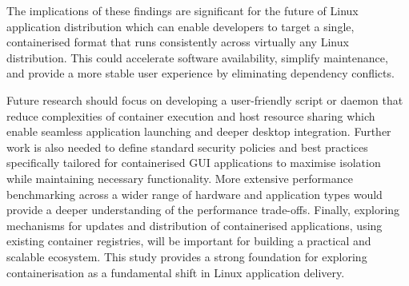 \documentclass[journal,onecolumn]{IEEEtran}
\begin{document}
The implications of these findings are significant for the future of Linux application distribution which can enable developers to target a single, containerised format that runs consistently across virtually any Linux distribution. This could accelerate software availability, simplify maintenance, and provide a more stable user experience by eliminating dependency conflicts.

Future research should focus on developing a user-friendly script or daemon that reduce complexities of container execution and host resource sharing which enable seamless application launching and deeper desktop integration. Further work is also needed to define standard security policies and best practices specifically tailored for containerised GUI applications to maximise isolation while maintaining necessary functionality. More extensive performance benchmarking across a wider range of hardware and application types would provide a deeper understanding of the performance trade-offs. Finally, exploring mechanisms for updates and distribution of containerised applications, using existing container registries, will be important for building a practical and scalable ecosystem. This study provides a strong foundation for exploring containerisation as a fundamental shift in Linux application delivery.

\newpage



%
%
\end{document}
